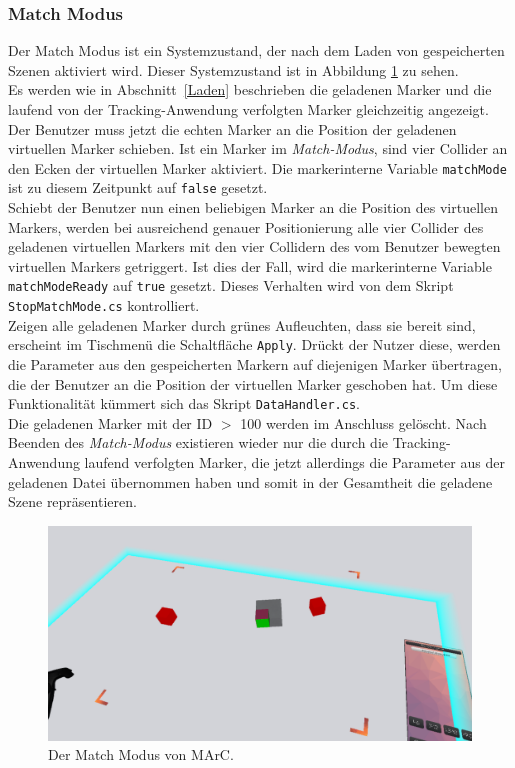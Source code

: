 \subsubsection{Match Modus}\label{MatchModus}
Der Match Modus ist ein Systemzustand, der nach dem Laden von gespeicherten Szenen aktiviert wird. Dieser Systemzustand ist in Abbildung \ref{fig:Matchmodus} zu sehen.\\
Es werden wie in Abschnitt~\ref{Laden} beschrieben die geladenen Marker und die laufend von der Tracking-Anwendung verfolgten Marker gleichzeitig angezeigt. Der Benutzer muss jetzt die echten Marker an die Position der geladenen virtuellen Marker schieben. Ist ein Marker im \emph{Match-Modus}, sind vier Collider an den Ecken der virtuellen Marker aktiviert. Die markerinterne Variable \texttt{matchMode} ist zu diesem Zeitpunkt auf \texttt{false} gesetzt.\\
Schiebt der Benutzer nun einen beliebigen Marker an die Position des virtuellen Markers, werden bei ausreichend genauer Positionierung alle vier Collider des geladenen virtuellen Markers mit den vier Collidern des vom Benutzer bewegten virtuellen Markers getriggert. Ist dies der Fall, wird die markerinterne Variable \texttt{matchModeReady} auf \texttt{true} gesetzt. Dieses Verhalten wird von dem Skript \texttt{StopMatchMode.cs} kontrolliert.\\
Zeigen alle geladenen Marker durch grünes Aufleuchten, dass sie bereit sind, erscheint im Tischmenü die Schaltfläche \texttt{Apply}. Drückt der Nutzer diese, werden die Parameter aus den gespeicherten Markern auf diejenigen Marker übertragen, die der Benutzer an die Position der virtuellen Marker geschoben hat. Um diese Funktionalität kümmert sich das Skript \texttt{DataHandler.cs}.\\
Die geladenen Marker mit der ID $>$ 100 werden im Anschluss gelöscht. Nach Beenden des \emph{Match-Modus} existieren wieder nur die durch die Tracking-Anwendung laufend verfolgten Marker, die jetzt allerdings die Parameter aus der geladenen Datei übernommen haben und somit in der Gesamtheit die geladene Szene repräsentieren.


\begin{figure}
	\centering
	\includegraphics[width=\textwidth]{Bilder/Matchmode}
	\caption{Der Match Modus von MArC.}
	\label{fig:Matchmodus}
\end{figure}


